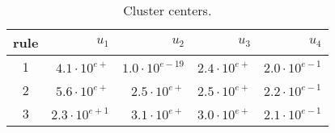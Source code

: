 \documentclass{article}
\begin{document}
\begin{table}[htbp]
\centering
\caption{Cluster centers.}
\begin{tabular}{|c|rrrr|}\hline
rule & $u_1$ & $u_2$ & $u_3$ & $u_4$ \\ \hline
   1 & $4.1\cdot 10^{e+}$ & $ 1.0\cdot 10^{e-19}$ & $ 2.4\cdot 10^{e+}$ & $ 2.0\cdot 10^{e-1}$ \\
   2 & $5.6\cdot 10^{e+}$ & $ 2.5\cdot 10^{e+}$ & $ 2.5\cdot 10^{e+}$ & $ 2.2\cdot 10^{e-1}$ \\
   3 & $2.3\cdot 10^{e+1}$ & $ 3.1\cdot 10^{e+}$ & $ 3.0\cdot 10^{e+}$ & $ 2.1\cdot 10^{e-1}$ \\
\hline
\end{tabular}
\label{tab:centers1}
\end{table}
\end{document}
